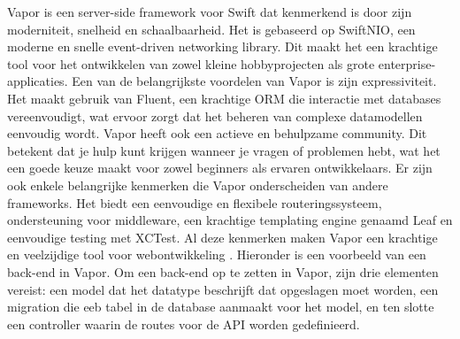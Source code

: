 Vapor is een server-side framework voor Swift dat kenmerkend is door zijn \\moderniteit, snelheid en schaalbaarheid. Het is gebaseerd op SwiftNIO, een \\moderne en snelle event-driven networking library. Dit maakt het een krachtige tool voor het ontwikkelen van zowel kleine hobbyprojecten als grote enterprise-applicaties. Een van de belangrijkste voordelen van Vapor is zijn expressiviteit. Het maakt gebruik van Fluent, een krachtige ORM die interactie met databases \\vereenvoudigt, wat ervoor zorgt dat het beheren van complexe datamodellen \\eenvoudig wordt. Vapor heeft ook een actieve en behulpzame community. Dit \\betekent dat je hulp kunt krijgen wanneer je vragen of problemen hebt, wat het een goede keuze maakt voor zowel beginners als ervaren ontwikkelaars. Er zijn ook enkele belangrijke kenmerken die Vapor onderscheiden van andere frameworks. Het biedt een eenvoudige en flexibele routeringssysteem, ondersteuning voor middleware, een krachtige templating engine genaamd Leaf en eenvoudige testing met XCTest. Al deze kenmerken maken Vapor een krachtige en veelzijdige tool voor webontwikkeling \autocite{Pant2023}.
Hieronder is een voorbeeld van een back-end in Vapor. Om een back-end op te zetten in Vapor, zijn drie elementen vereist: een model dat het datatype beschrijft dat opgeslagen moet worden, een migration die eeb tabel in de database aanmaakt voor het model, en ten slotte een controller waarin de routes voor de API worden gedefinieerd. 
